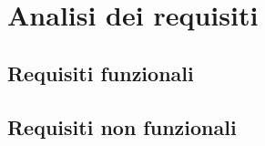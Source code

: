 \chapter{Analisi dei requisiti}\label{ch:requirements}
  \section{Requisiti funzionali}
  \section{Requisiti non funzionali}
